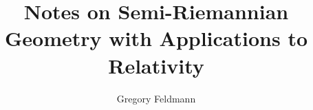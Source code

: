 \documentclass[]{article}
\title{Notes on Semi-Riemannian Geometry with Applications to Relativity}
\author{Gregory Feldmann}
\begin{document}
\maketitle

\begin{abstract}

\end{abstract}

\section{}
\end{document}
